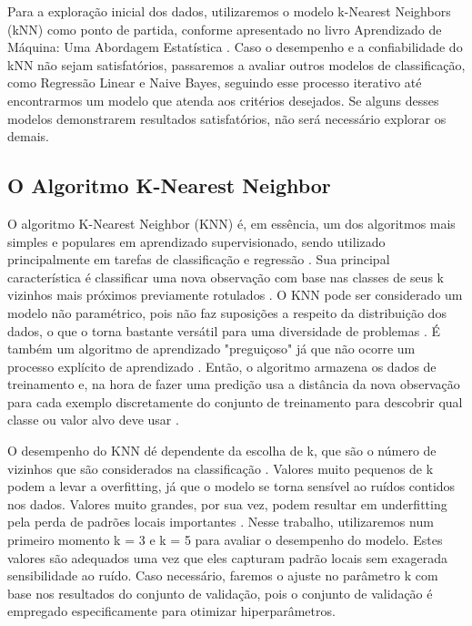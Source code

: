 Para a exploração inicial dos dados, utilizaremos o modelo k-Nearest Neighbors (kNN) como ponto de partida, conforme apresentado no livro Aprendizado de Máquina: Uma Abordagem Estatística . Caso o desempenho e a confiabilidade do kNN não sejam satisfatórios, passaremos a avaliar outros modelos de classificação, como Regressão Linear e Naive Bayes, seguindo esse processo iterativo até encontrarmos um modelo que atenda aos critérios desejados. Se alguns desses modelos demonstrarem resultados satisfatórios, não será necessário explorar os demais.

\subsection{O Algoritmo K-Nearest Neighbor}

O algoritmo K-Nearest Neighbor (KNN) é, em essência, um dos algoritmos mais simples e populares em aprendizado supervisionado, sendo utilizado principalmente em tarefas de classificação e regressão \cite{zhang2016}. Sua principal característica é classificar uma nova observação com base nas classes de seus k vizinhos mais próximos previamente rotulados \cite{zhang2016}. O KNN pode ser considerado um modelo não paramétrico, pois não faz suposições a respeito da distribuição dos dados, o que o torna bastante versátil para uma diversidade de problemas \cite{zhang2016}. É também um algoritmo de aprendizado "preguiçoso" já que não ocorre um processo explícito de aprendizado \cite{zhang2016}.  Então, o algoritmo armazena os dados de treinamento e, na hora de fazer uma predição usa a distância da nova observação para cada exemplo discretamente do conjunto de treinamento para descobrir qual classe ou valor alvo deve usar \cite{zhang2016}.

O desempenho do KNN dé dependente da escolha de k, que são o número de vizinhos que são considerados na classificação \cite{zhang2016}. Valores muito pequenos de k podem a levar a overfitting, já que o modelo se torna sensível ao ruídos contidos nos dados. Valores muito grandes, por sua vez, podem resultar em underfitting pela perda de padrões locais importantes \cite{elkan2011}. Nesse trabalho, utilizaremos num primeiro momento k = 3 e k = 5 para avaliar o desempenho do modelo. Estes valores são adequados uma vez que eles capturam padrão locais sem exagerada sensibilidade ao ruído. Caso necessário, faremos o ajuste no parâmetro k com base nos resultados do conjunto de validação, pois o conjunto de validação é empregado especificamente para otimizar hiperparâmetros.

